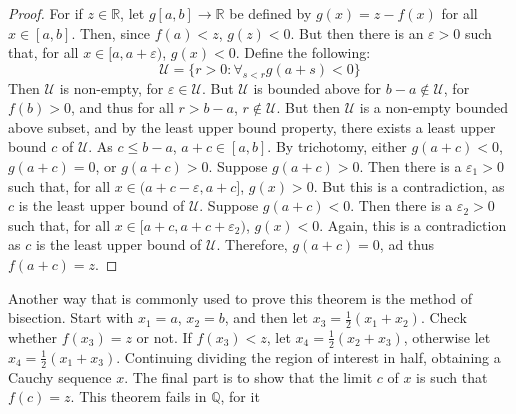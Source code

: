 \documentclass[crop=false,class=book,oneside]{standalone}
\begin{document}
            \begin{proof}
                For if $z\in\mathbb{R}$, let
                $g[a,b]\rightarrow\mathbb{R}$ be defined by
                $g(x)=z-f(x)$ for all $x\in[a,b]$. Then,
                since $f(a)<z$, $g(z)<0$. But then there
                is an $\varepsilon>0$ such that, for
                all $x\in[a,a+\varepsilon)$,
                $g(x)<0$. Define the following:
                \begin{equation}
                    \mathcal{U}=
                    \{r>0:\forall_{s<r}g(a+s)<0\}
                \end{equation}
                Then $\mathcal{U}$ is non-empty, for
                $\varepsilon\in\mathcal{U}$. But
                $\mathcal{U}$ is bounded above for
                $b-a\notin\mathcal{U}$, for
                $f(b)>0$, and thus for all
                $r>b-a$, $r\notin\mathcal{U}$. But then
                $\mathcal{U}$ is a non-empty bounded
                above subset, and by the least upper
                bound property, there exists a least
                upper bound $c$ of $\mathcal{U}$.
                As $c\leq{b-a}$, $a+c\in[a,b]$.
                By trichotomy, either $g(a+c)<0$,
                $g(a+c)=0$, or $g(a+c)>0$. Suppose
                $g(a+c)>0$. Then there is a
                $\varepsilon_{1}>0$ such that,
                for all $x\in(a+c-\varepsilon,a+c]$,
                $g(x)>0$. But this is a contradiction,
                as $c$ is the least upper bound of
                $\mathcal{U}$. Suppose $g(a+c)<0$.
                Then there is a $\varepsilon_{2}>0$
                such that, for all
                $x\in[a+c,a+c+\varepsilon_{2})$,
                $g(x)<0$. Again, this is a contradiction
                as $c$ is the least upper bound of
                $\mathcal{U}$. Therefore, $g(a+c)=0$,
                ad thus $f(a+c)=z$.
            \end{proof}
            Another way that is commonly used to prove this
            theorem is the method of bisection. Start with
            $x_{1}=a$, $x_{2}=b$, and then let
            $x_{3}=\tfrac{1}{2}(x_{1}+x_{2})$. Check whether
            $f(x_{3})=z$ or not. If $f(x_{3})<z$,
            let $x_{4}=\tfrac{1}{2}(x_{2}+x_{3})$, otherwise
            let $x_{4}=\tfrac{1}{2}(x_{1}+x_{3})$. Continuing
            dividing the region of interest in half, obtaining
            a Cauchy sequence $x$. The final part
            is to show that the limit $c$ of $x$ is such that
            $f(c)=z$. This theorem fails in $\mathbb{Q}$, for it
\end{document}
